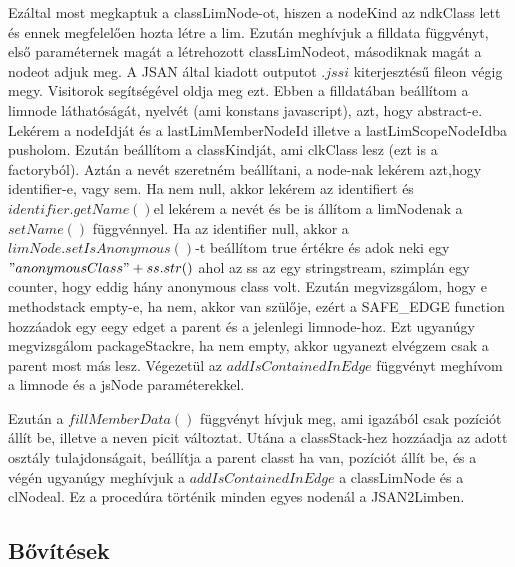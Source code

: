 \noindent

Ezáltal most megkaptuk a classLimNode-ot, hiszen a nodeKind az ndkClass lett és ennek megfelelően hozta létre a lim.
Ezután meghívjuk a filldata függvényt, első paraméternek magát a létrehozott classLimNodeot, másodiknak magát a nodeot adjuk meg.
A JSAN által kiadott outputot $.jssi$ kiterjesztésű fileon végig megy. Visitorok segítségével oldja meg ezt.
Ebben a filldatában beállítom a limnode láthatóságát, nyelvét (ami konstans javascript), azt, hogy abstract-e.
Lekérem a nodeIdját és a lastLimMemberNodeId illetve a lastLimScopeNodeIdba pusholom. Ezután beállítom a classKindját, ami clkClass lesz (ezt is a factoryból).
Aztán a nevét szeretném beállítani, a node-nak lekérem azt,hogy identifier-e, vagy sem. Ha nem null, akkor lekérem az identifiert és $identifier.getName()$el lekérem a nevét és be is állítom a limNodenak a $setName()$ függvénnyel.
Ha az identifier null, akkor a $limNode.setIsAnonymous()$-t beállítom true értékre és adok neki egy $"anonymousClass"+ ss.str()$ ahol az ss az egy stringstream, szimplán egy counter, hogy eddig hány anonymous class volt.
Ezután megvizsgálom, hogy e methodstack empty-e, ha nem, akkor van szülője, ezért a SAFE\_EDGE function hozzáadok egy eegy edget a parent és a jelenlegi limnode-hoz.
Ezt ugyanúgy megvizsgálom packageStackre, ha nem empty, akkor ugyanezt elvégzem csak a parent most más lesz.
Végezetül az $addIsContainedInEdge$ függvényt meghívom a limnode és a jsNode paraméterekkel.

\noindent

Ezután a $fillMemberData()$ függvényt hívjuk meg, ami igazából csak pozíciót állít be, illetve a neven picit változtat.
Utána a classStack-hez hozzáadja az adott osztály tulajdonságait, beállítja a parent classt ha van, pozíciót állít be, és a végén ugyanúgy meghívjuk a $addIsContainedInEdge$ a classLimNode és a clNodeal.
Ez a procedúra történik minden egyes nodenál a JSAN2Limben.

\subsection{Bővítések}

\noindent

